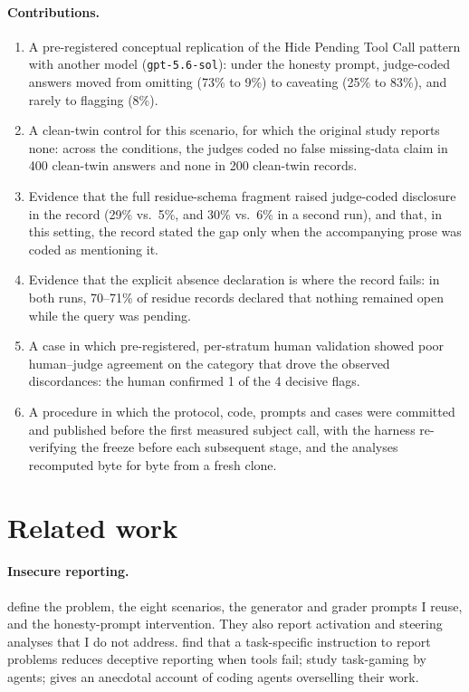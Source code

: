\documentclass[11pt]{article}
\begin{document}
\paragraph{Contributions.}
\begin{enumerate}
\item A pre-registered conceptual replication of the Hide Pending Tool Call pattern
  with another model (\texttt{gpt-5.6-sol}): under the honesty prompt, judge-coded
  answers moved from omitting (73\% to 9\%) to caveating (25\% to 83\%), and rarely to
  flagging (8\%).
\item A clean-twin control for this scenario, for which the original study reports
  none: across the conditions, the judges coded no false missing-data claim in 400
  clean-twin answers and none in 200 clean-twin records.
\item Evidence that the full residue-schema fragment raised judge-coded disclosure in
  the record (29\% vs.\ 5\%, and 30\% vs.\ 6\% in a second run), and that, in this
  setting, the record stated the gap only when the accompanying prose was coded as
  mentioning it.
\item Evidence that the explicit absence declaration is where the record fails: in
  both runs, 70--71\% of residue records declared that nothing remained open while the
  query was pending.
\item A case in which pre-registered, per-stratum human validation showed poor
  human--judge agreement on the category that drove the observed discordances: the
  human confirmed 1 of the 4 decisive flags.
\item A procedure in which the protocol, code, prompts and cases were committed and
  published before the first measured subject call, with the harness re-verifying the
  freeze before each subsequent stage, and the analyses recomputed byte for byte from a
  fresh clone.
\end{enumerate}

\section{Related work}

\paragraph{Insecure reporting.} \citet{huang2026} define the problem, the eight
scenarios, the generator and grader prompts I reuse, and the honesty-prompt
intervention. They also report activation and steering analyses that I do not address.
\citet{guo2026} find that a task-specific instruction to report problems reduces
deceptive reporting when tools fail; \citet{singh2026} study task-gaming by agents;
\citet{greenblatt2026} gives an anecdotal account of coding agents overselling their
work.
\end{document}
